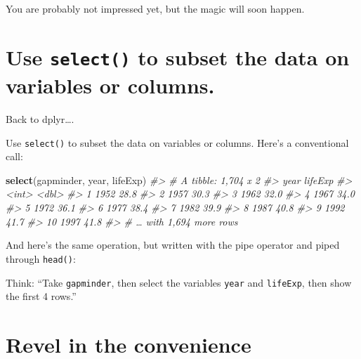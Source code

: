 \documentclass[
]{book}
\newenvironment{Shaded}{\begin{snugshade}}{\end{snugshade}}
\newcommand{\CommentTok}[1]{\textcolor[rgb]{0.56,0.35,0.01}{\textit{#1}}}
\newcommand{\DecValTok}[1]{\textcolor[rgb]{0.00,0.00,0.81}{#1}}
\newcommand{\KeywordTok}[1]{\textcolor[rgb]{0.13,0.29,0.53}{\textbf{#1}}}
\newcommand{\NormalTok}[1]{#1}
\newcommand{\OperatorTok}[1]{\textcolor[rgb]{0.81,0.36,0.00}{\textbf{#1}}}
\newcommand{\StringTok}[1]{\textcolor[rgb]{0.31,0.60,0.02}{#1}}
\begin{document}
You are probably not impressed yet, but the magic will soon happen.

\hypertarget{use-select-to-subset-the-data-on-variables-or-columns.}{%
\section{\texorpdfstring{Use \texttt{select()} to subset the data on variables or columns.}{Use select() to subset the data on variables or columns.}}\label{use-select-to-subset-the-data-on-variables-or-columns.}}

Back to dplyr\ldots.

Use \texttt{select()} to subset the data on variables or columns. Here's a conventional call:

\begin{Shaded}
\begin{Highlighting}[]
\KeywordTok{select}\NormalTok{(gapminder, year, lifeExp)}
\CommentTok{#> # A tibble: 1,704 x 2}
\CommentTok{#>     year lifeExp}
\CommentTok{#>    <int>   <dbl>}
\CommentTok{#>  1  1952    28.8}
\CommentTok{#>  2  1957    30.3}
\CommentTok{#>  3  1962    32.0}
\CommentTok{#>  4  1967    34.0}
\CommentTok{#>  5  1972    36.1}
\CommentTok{#>  6  1977    38.4}
\CommentTok{#>  7  1982    39.9}
\CommentTok{#>  8  1987    40.8}
\CommentTok{#>  9  1992    41.7}
\CommentTok{#> 10  1997    41.8}
\CommentTok{#> # … with 1,694 more rows}
\end{Highlighting}
\end{Shaded}

And here's the same operation, but written with the pipe operator and piped through \texttt{head()}:

\begin{Shaded}
\end{Shaded}

Think: ``Take \texttt{gapminder}, then select the variables \texttt{year} and \texttt{lifeExp}, then show the first 4 rows.''

\hypertarget{revel-in-the-convenience}{%
\section{Revel in the convenience}\label{revel-in-the-convenience}}
\end{document}
